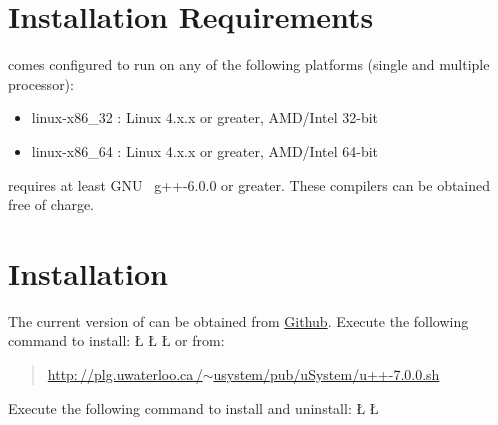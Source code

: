 \documentclass[openright,twoside]{report}
\begin{document}
\section{Installation Requirements}
\label{s:InstallationRequirements}

\uC comes configured to run on any of the following platforms (single and multiple processor):
\begin{itemize}[parsep=0pt,itemsep=0pt]
\item
linux-x86\_32 : Linux 4.x.x or greater, AMD/Intel 32-bit
\item
linux-x86\_64 : Linux 4.x.x or greater, AMD/Intel 64-bit
\end{itemize}
\uC requires at least GNU~\cite{GNU-C++} g++-6.0.0 or greater.
These compilers can be obtained free of charge.


\section{Installation}

The current version of \uC can be obtained from \href{https://github.com/pabuhr/uCPP}{Github}.
Execute the following command to install:
\LGinlinefalse\LGbegin\lgrinde
\L{}
\L{}
\L{}
\endlgrinde\LGend
or from:
\begin{quote}
\href{http://plg.uwaterloo.ca/~usystem/pub/uSystem/u++-7.0.0.sh}{\textsf{http:\,//\hspace{0.1ex}plg.uwaterloo.ca\,/$\sim$usystem/pub/uSystem/u++-7.0.0.sh}}
\end{quote}
Execute the following command to install and uninstall:
\LGinlinefalse\LGbegin\lgrinde
\L{}
\L{}
\endlgrinde\LGend
\end{document}
